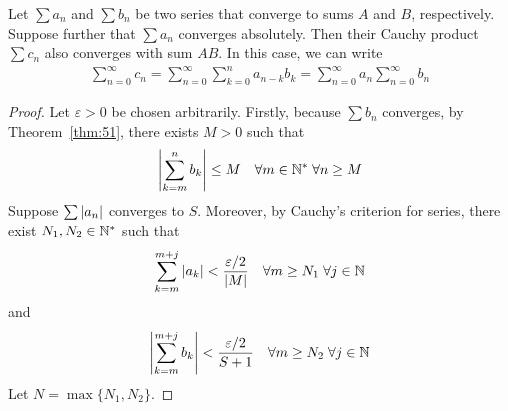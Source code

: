 \documentclass[thmcnt=section, 12pt]{my-elegantbook}
\begin{document}
\begin{theorem}[Mertens]
    Let $\sum a_n$ and $\sum b_n$ be two series that converge to sums $A$ and $B$, respectively. Suppose further that $\sum a_n$ converges absolutely. Then their Cauchy product $\sum c_n$ also converges with sum $AB$. In this case, we can write 
    \begin{align*}
        \sum_{n=0}^\infty c_n
        = \sum_{n=0}^\infty \sum_{k=0}^n a_{n-k} b_k
        = \sum_{n=0}^\infty a_n
        \sum_{n=0}^\infty b_n
    \end{align*}
\end{theorem}

\begin{proof}
    Let $\varepsilon > 0$ be chosen arbitrarily. Firstly, because $\sum b_n$ converges, by Theorem~\ref{thm:51}, there exists $M > 0$ such that
    \begin{align}
        \left\lvert \sum_{k=m}^n b_k \right\rvert \leq M
        \quad \forall m \in \mathbb{N}^\ast \; 
        \forall n \geq M
        \label{eq:112}
    \end{align}
    Suppose $\sum \left\lvert a_n \right\rvert$ converges to $S$. Moreover, by Cauchy's criterion for series, there exist $N_1, N_2 \in \mathbb{N}^\ast$ such that 
    \begin{align}
        \sum_{k=m}^{m+j} \left\lvert a_k \right\rvert
        < \frac{\varepsilon / 2}{\left\lvert M \right\rvert}
        \quad
        \forall m \geq N_1 \; 
        \forall j \in \mathbb{N}
        \label{eq:110}
    \end{align}
    and
    \begin{align}
        \left\lvert \sum_{k=m}^{m+j} b_k \right\rvert
        < \frac{\varepsilon / 2}{S + 1}
        \quad
        \forall m \geq N_2 \; 
        \forall j \in \mathbb{N}
        \label{eq:111}
    \end{align}
    Let $N = \max \{N_1, N_2\}$.


\end{proof}
\end{document}
